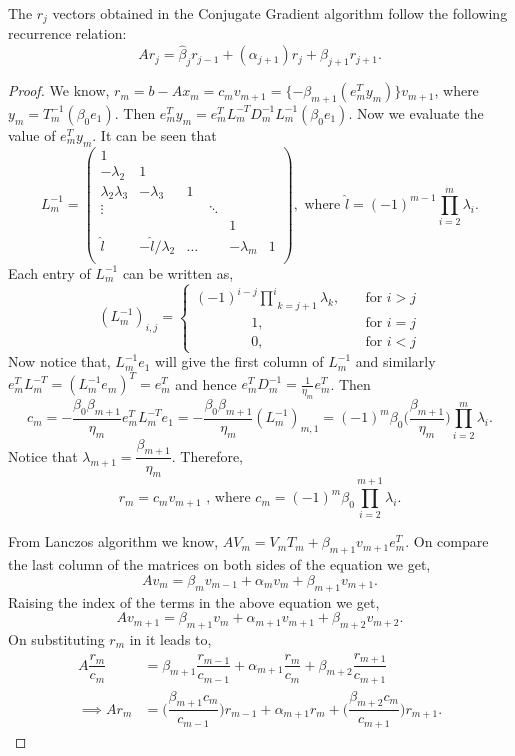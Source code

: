 \documentclass[10pt,a4paper]{article}
\begin{document}
\begin{prop}
The $r_j$ vectors obtained in the Conjugate Gradient algorithm follow the following recurrence relation:
$$Ar_j=\hat{\beta}_jr_{j-1}+(\alpha_{j+1})r_j+\hat{\beta}_{j+1}r_{j+1}.$$ 
\end{prop}

\begin{proof}
We know, $r_m=b-Ax_m=c_mv_{m+1}=\{-\beta_{m+1}(e^T_my_m)\}v_{m+1}$, where  $y_m=T^{-1}_m(\beta_0e_1).$ Then $e^T_my_m=e^T_mL^{-T}_mD^{-1}_mL^{-1}_m(\beta_0e_1)$. Now we evaluate the value of $e^T_my_m$. It can be seen that 
$$L^{-1}_m =
\left( \begin{array}{cccccc}
1 &  &  &  &  & \\
-\lambda_2 & 1 &  &  &  & \\
\lambda_2\lambda_3 & -\lambda_3 & 1 &  &  & \\
\vdots &  &  & \ddots &  & \\
 &  &  &  & 1 &  \\
\hat{l} & -\hat{l}/\lambda_2 & \hdots &  & -\lambda_m & 1 \\
\end{array} \right),\text{ where }\hat{l}=(-1)^{m-1}\prod^m_{i=2}\lambda_i.$$
Each entry of $L^{-1}_m$ can be written as,
\[   
(L^{-1}_m)_{i,j} = 
     \begin{cases}	
      (-1)^{i-j}\underset{k = j+1}{\overset{i}{\prod}}\lambda_k, &\quad\text{for }i>j\\
      \qquad \qquad 1, &\quad\text{for }i=j\\
      \qquad \qquad 0, &\quad\text{for }i<j
     \end{cases}
\]
Now notice that, $L^{-1}_me_1$ will give the first column of $L^{-1}_m$ and similarly $e^T_mL^{-T}_m = (L^{-1}_me_m)^T = e^T_m$ and hence $e^T_mD^{-1}_m=\frac{1}{\eta_m}e^T_m$. Then $$c_m=-\dfrac{\beta_0\beta_{m+1}}{\eta_m}e^T_mL^{-T}_me_1=-\dfrac{\beta_0\beta_{m+1}}{\eta_m}(L^{-1}_m)_{m,1}=(-1)^{m}\beta_0\bigg(\dfrac{\beta_{m+1}}{\eta_m}\bigg)\underset{i=2}{\overset{m}{\prod}}\lambda_i.$$
Notice that $\lambda_{m+1}=\dfrac{\beta_{m+1}}{\eta_m}$. Therefore, $$r_m = c_mv_{m+1}\text{ , where }c_m=(-1)^{m}\beta_0\underset{i=2}{\overset{m+1}{\prod}}\lambda_i.$$

From Lanczos algorithm we know, $AV_m=V_mT_m+\beta_{m+1}v_{m+1}e^T_m.$ On compare the last column of the matrices on both sides of the equation we get, 
$$Av_m=\beta_mv_{m-1}+\alpha_mv_m+\beta_{m+1}v_{m+1}.$$
Raising the index of the terms in the above equation we get,
$$Av_{m+1}=\beta_{m+1}v_{m}+\alpha_{m+1}v_{m+1}+\beta_{m+2}v_{m+2}.$$
On substituting $r_m$ in it leads to,
\begin{align*}
A\dfrac{r_m}{c_m}&=\beta_{m+1}\dfrac{r_{m-1}}{c_{m-1}}+\alpha_{m+1}\dfrac{r_{m}}{c_{m}}+\beta_{m+2}\dfrac{r_{m+1}}{c_{m+1}} \\
\implies Ar_m&=\bigg(\dfrac{\beta_{m+1}c_m}{c_{m-1}}\bigg)r_{m-1}+\alpha_{m+1}r_{m}+\bigg(\dfrac{\beta_{m+2}c_m}{c_{m+1}}\bigg)r_{m+1}.
\end{align*}
\end{proof}
\end{document}
